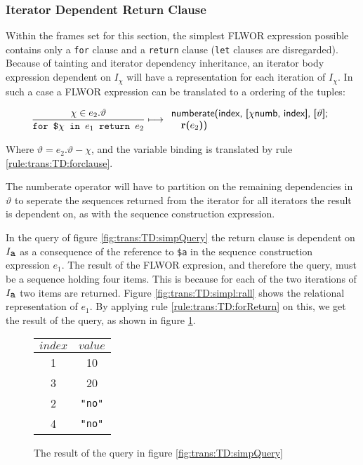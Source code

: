 \subsubsection{Iterator Dependent Return Clause}
Within the frames set for this section, the simplest FLWOR expression possible contains only a \texttt{for} clause
and a \texttt{return} clause (\texttt{let} clauses are disregarded). Because of tainting and iterator
dependency inheritance, an iterator body expression dependent on $I_{\chi}$ will have a representation for each
iteration of $I_{\chi}$. In such a case a FLWOR expression can be translated to a ordering of the tuples:

\begin{equation}
\frac{\chi \in e_{2}.\vartheta}{\mbox{\texttt{for \$}}\chi\mbox{\texttt{ in }}e_{1}\mbox{\texttt{ return }}e_{2}}
\longmapsto
\begin{array}{l}
\mbox{\textsf{numberate(index, [}}\chi\mbox{\textsf{numb, index], [}}\vartheta\mbox{\textsf{];}} \\ \quad
\mbox{\textbf{r(}}e_{2}\mbox{\textbf{)}\textsf{)}}
\end{array}
\label{rule:trans:TD:forReturn}
\end{equation}

Where $\vartheta = e_{2}.\vartheta - \chi$, and the variable binding is translated by rule
\ref{rule:trans:TD:forclause}.

The \textsf{numberate} operator will have to partition on the remaining dependencies in $\vartheta$ to seperate
the sequences returned from the iterator for all iterators the result is dependent on, as with the sequence
construction expression.

\noindent
\begin{myExample}
In the query of figure \ref{fig:trans:TD:simpQuery} the return clause is dependent on $I_{\mbox{\texttt{a}}}$
as a consequence of the reference to \texttt{\$a} in the sequence construction expression $e_{1}$. The result of
the FLWOR expresion, and therefore the query, must be a sequence holding four items. This is because for each of
the two iterations of $I_{\mbox{\texttt{a}}}$ two items are returned. Figure \ref{fig:trans:TD:simpl:rall} shows
the relational representation of $e_{1}$. By applying rule \ref{rule:trans:TD:forReturn} on this, we get the
result of the query, as shown in figure \ref{fig:trans:TD:simpRes}.

\begin{figure}[h]
\centering
\begin{tabular}{|c|c|} \hline
$index$ & $value$ \\\hline
1 & 10 \\\hline
3 & 20 \\\hline
2 & \texttt{"no"} \\\hline
4 & \texttt{"no"} \\\hline
\end{tabular}
\caption{The result of the query in figure \ref{fig:trans:TD:simpQuery}}
\label{fig:trans:TD:simpRes}
\end{figure}

\end{myExample}

